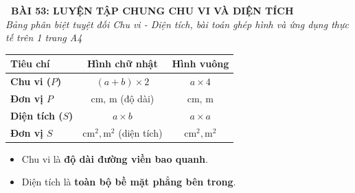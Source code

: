 \documentclass[11pt,a4paper]{article}
\begin{document}
\begin{tcolorbox}[
  enhanced,
  colback=white,
  colframe=primary,
  arc=3mm,
  boxrule=1.2pt,
  left=4mm, right=4mm, top=2.5mm, bottom=2.5mm,
  drop shadow=black!10!white
]
  \centering
  {\Large\bfseries\color{primary}\faBookmark\ BÀI 53: LUYỆN TẬP CHUNG CHU VI VÀ DIỆN TÍCH}\\[1.5mm]
  {\small\itshape\color{black!75}Bảng phân biệt tuyệt đối Chu vi - Diện tích, bài toán ghép hình và ứng dụng thực tế trên 1 trang A4}
\end{tcolorbox}

\vspace{-2mm}


\noindent
\begin{minipage}[t]{0.49\textwidth}\vspace{0pt}
\begin{tcolorbox}[
  enhanced,
  colback=blue!4!white,
  colframe=blue!75!black,
  arc=2mm, boxrule=0.8pt,
  left=2mm, right=2mm, top=1.8mm, bottom=1.8mm,
  title={\footnotesize\bfseries\color{white}\faBalanceScale\ 1. Bảng đối chiếu song song Chu vi -- Diện tích}
]
{\footnotesize
\begin{center}
\renewcommand{\arraystretch}{1.15}
\begin{tabular}{|l|c|c|}
  \hline
  \textbf{Tiêu chí} & \textbf{Hình chữ nhật} & \textbf{Hình vuông} \\
  \hline
  \textbf{Chu vi ($P$)} & $(a + b) \times 2$ & $a \times 4$ \\
  \textbf{Đơn vị $P$} & $\text{cm, m}$ (độ dài) & $\text{cm, m}$ \\
  \hline
  \textbf{Diện tích ($S$)} & $a \times b$ & $a \times a$ \\
  \textbf{Đơn vị $S$} & $\text{cm}^2, \text{m}^2$ (diện tích) & $\text{cm}^2, \text{m}^2$ \\
  \hline
\end{tabular}
\end{center}
\begin{itemize}\setlength{\itemsep}{0.5pt}\setlength{\leftskip}{-2.5mm}
  \item Chu vi là \textbf{độ dài đường viền bao quanh}.
  \item Diện tích là \textbf{toàn bộ bề mặt phẳng bên trong}.
\end{itemize}
}
\end{tcolorbox}
\end{minipage}
\hfill
\end{document}
